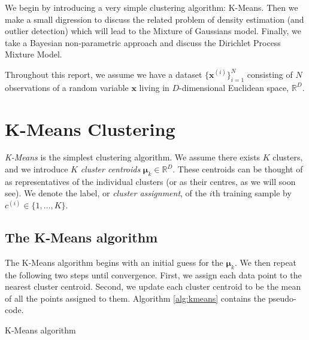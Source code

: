 \documentclass[final,3p,times,twocolumn]{elsarticle}
\DeclareMathOperator*{\argmin}{arg\,min}
\begin{document}
We begin by introducing a very simple clustering algorithm: K-Means. 
Then we make a small digression to discuss the related problem of density estimation (and outlier detection) which will lead to the Mixture of Gaussians model.
Finally, we take a Bayesian non-parametric approach and discuss the Dirichlet Process Mixture Model.

Throughout this report, we assume we have a dataset $\{\boldsymbol x^{(i)}\}_{i=1}^N$ consisting of $N$ observations of a random variable $\boldsymbol x$ living in $D$-dimensional Euclidean space, $\mathbb{R}^D$.
 




\section{K-Means Clustering}
\emph{K-Means} is the simplest clustering algorithm.
We assume there exists $K$ clusters, and we introduce $K$ \emph{cluster centroids} $\boldsymbol \mu_k \in \mathbb{R}^D$.
These centroids can be thought of as representatives of the individual clusters (or as their centres, as we will soon see).
We denote the label, or \emph{cluster assignment}, of the $i$th training sample by $c^{(i)} \in \{1, \dots, K\}$. 

\subsection{The K-Means algorithm}

The K-Means algorithm begins with an initial guess for the $\boldsymbol \mu_k$. 
We then repeat the following two steps until convergence.
First, we assign each data point to the nearest cluster centroid.
Second, we update each cluster centroid to be the mean of all the points assigned to them.
Algorithm \ref{alg:kmeans} contains the pseudo-code.

\begin{algorithm}
\caption{K-Means algorithm}
\label{alg:kmeans}
\begin{algorithmic}[1]
\Repeat
{}\Comment
\State{$c^{(i)} = \argmin_k ||\boldsymbol{x}_i - \boldsymbol{k}_k||$}
\EndFor
{}
\EndFor
{}
\EndProcedure \\
\end{algorithmic}
\end{algorithm}
\end{document}
